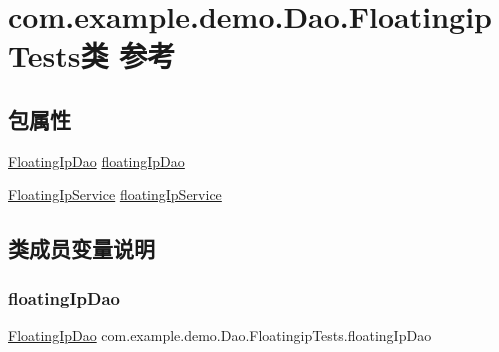 \hypertarget{classcom_1_1example_1_1demo_1_1_dao_1_1_floatingip_tests}{}\section{com.\+example.\+demo.\+Dao.\+Floatingip\+Tests类 参考}
\label{classcom_1_1example_1_1demo_1_1_dao_1_1_floatingip_tests}
\subsection*{包属性}
\begin{DoxyCompactItemize}
\item 
\mbox{\hyperlink{interfacecom_1_1example_1_1demo_1_1dao_1_1_floating_ip_dao}{Floating\+Ip\+Dao}} \mbox{\hyperlink{classcom_1_1example_1_1demo_1_1_dao_1_1_floatingip_tests_a5b720efc4364855fcbb3ddf3f9aafe20}{floating\+Ip\+Dao}}
\item 
\mbox{\hyperlink{classcom_1_1example_1_1demo_1_1service_1_1_floating_ip_service}{Floating\+Ip\+Service}} \mbox{\hyperlink{classcom_1_1example_1_1demo_1_1_dao_1_1_floatingip_tests_a888ad6e7c6f1a13824c9293230016940}{floating\+Ip\+Service}}
\end{DoxyCompactItemize}


\subsection{类成员变量说明}
\mbox{\label{classcom_1_1example_1_1demo_1_1_dao_1_1_floatingip_tests_a5b720efc4364855fcbb3ddf3f9aafe20}} 
\subsubsection{\texorpdfstring{floating\+Ip\+Dao}{floatingIpDao}}
{\footnotesize\ttfamily \mbox{\hyperlink{interfacecom_1_1example_1_1demo_1_1dao_1_1_floating_ip_dao}{Floating\+Ip\+Dao}} com.\+example.\+demo.\+Dao.\+Floatingip\+Tests.\+floating\+Ip\+Dao\hspace{0.3cm}{\ttfamily [package]}}

